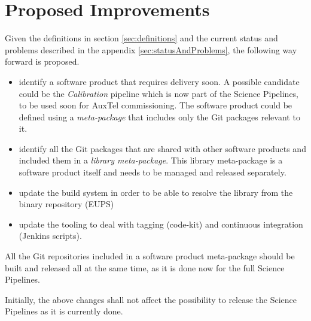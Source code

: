 \newpage
\section{Proposed Improvements}\label{sec:proimp}

Given the definitions in section \ref{sec:definitions} and the current status and problems described in the appendix \ref{sec:statusAndProblems}, the following way forward is proposed.

\begin{itemize}
\item identify a software product that requires delivery soon.
A possible candidate could be the \textit{Calibration} pipeline which is now  part of the Science Pipelines, to be used soon for AuxTel commissioning.
The software product could be defined using a \textit{meta-package} that includes only the Git packages relevant to it.
\item identify all the Git packages that are shared with other software products and included them in a \textit{library meta-package}.
This library meta-package is a software product itself and needs to be managed and released separately.
\item update the build system in order to be able to resolve the library from the binary repository (EUPS)
\item update the tooling to deal with tagging (code-kit) and continuous integration (Jenkins scripts).
\end{itemize}

All the Git repositories included in a software product meta-package should be built and released all at the same time, as it is done now for the full Science Pipelines.

Initially, the above changes shall not affect the possibility to release the Science Pipelines as it is currently done.

